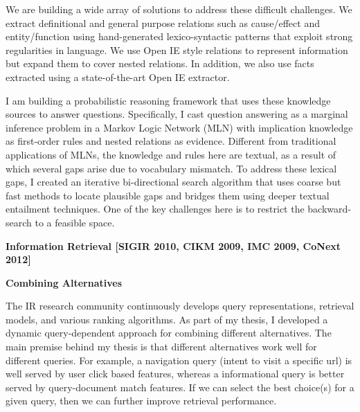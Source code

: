 \documentclass[a4paper,11pt,onecolumn]{article}
\newcommand{\eat}[1]{}
\begin{document}
We are building a wide array of solutions to address these difficult challenges. We extract definitional and general purpose relations such as cause/effect and entity/function using hand-generated lexico-syntactic patterns that exploit strong regularities in language. We use Open IE style relations to represent information but expand them to cover nested relations. In addition, we also use facts extracted using a state-of-the-art Open IE extractor.

I am building a probabilistic reasoning framework that uses these knowledge sources to answer questions. Specifically, I cast question answering as a marginal inference problem in a Markov Logic Network (MLN) with implication knowledge as first-order rules and nested relations as evidence. Different from traditional applications of MLNs, the knowledge and rules here are textual, as a result of which several gaps arise due to vocabulary mismatch. To address these lexical gaps, I created an iterative bi-directional search algorithm that uses coarse but fast methods to locate plausible gaps and bridges them using deeper textual entailment techniques. One of the key challenges here is to restrict the backward-search to a feasible space. 

\eat{For acquiring definitional knowledge we exploit the strong regularities in definitional language to produce open ie style relations representing the definition. A typical definition includes the class or semantic type information about the term and one or more {\em definitional} properties. We used a handful of patterns covered 50\% of the definitions mined from the web at a high precision. For extracting domain knowledge, we use hand-generated dependency patterns to extract general purpose relations such as cause/effect. I am cure
}

{\bf Information Retrieval [SIGIR 2010, CIKM 2009, IMC 2009, CoNext 2012]}


{\bf Combining Alternatives}

The IR research community continuously develops query representations, retrieval models, and various ranking algorithms. As part of my thesis, I developed a dynamic query-dependent approach for combining different alternatives. The main premise behind my thesis is that different alternatives work well for different queries. For example, a navigation query (intent to visit a specific url) is well served by user click based features, whereas a informational query is better served by query-document match features. If we can select the best choice(s) for a given query, then we can further improve retrieval performance. 
\end{document}
